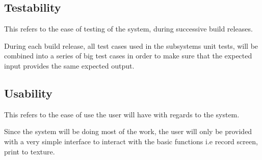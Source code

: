 \subsection{Testability}
This refers to the ease of testing of the system, during successive build releases.

During each build release, all test cases used in the subsystems unit tests, will be combined into a series of big test cases in order to make sure that the expected input provides the same expected output.

\subsection{Usability}
This refers to the ease of use the user will have with regards to the system.

Since the system will be doing most of the work, the user will only be provided with a very simple interface to interact with the basic functions i.e record screen, print to texture.
